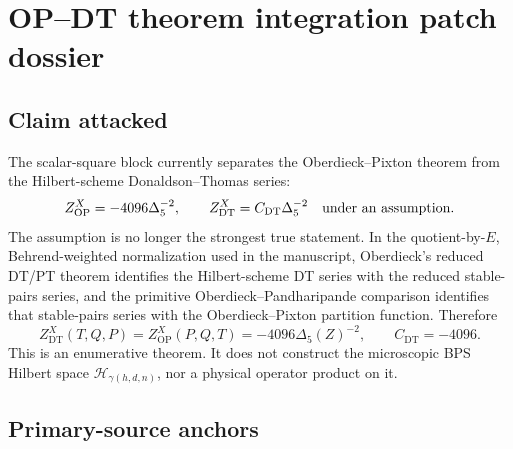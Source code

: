 \section{OP--DT theorem integration patch dossier}
\label{sec:op-dt-theorem-integration-patch}

\subsection{Claim attacked}

The scalar-square block currently separates the Oberdieck--Pixton
theorem from the Hilbert-scheme Donaldson--Thomas series:
\[
Z^X_{\mathrm{OP}}=-4096\Delta_5^{-2},
\qquad
Z^X_{\mathrm{DT}}=C_{\mathrm{DT}}\Delta_5^{-2}
\quad\hbox{under an assumption.}
\]
The assumption is no longer the strongest true statement.  In the
quotient-by-\(E\), Behrend-weighted normalization used in the manuscript,
Oberdieck's reduced DT/PT theorem identifies the Hilbert-scheme DT series
with the reduced stable-pairs series, and the primitive
Oberdieck--Pandharipande comparison identifies that stable-pairs series
with the Oberdieck--Pixton partition function.  Therefore
\begin{equation}
\label{eq:cell14-main}
Z^X_{\mathrm{DT}}(T,Q,P)
=Z^X_{\mathrm{OP}}(P,Q,T)
=-4096\Delta_5(Z)^{-2},
\qquad
C_{\mathrm{DT}}=-4096.
\end{equation}
This is an enumerative theorem.  It does not construct the microscopic
BPS Hilbert space \(\mathcal H_{\gamma(h,d,n)}\), nor a physical operator
product on it.

\subsection{Primary-source anchors}


